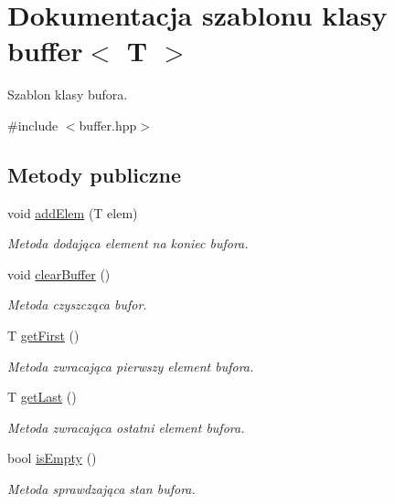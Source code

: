 \hypertarget{classbuffer}{}\section{Dokumentacja szablonu klasy buffer$<$ T $>$}
\label{classbuffer}


Szablon klasy bufora.  




{\ttfamily \#include $<$buffer.\+hpp$>$}

\subsection*{Metody publiczne}
\begin{DoxyCompactItemize}
\item 
void \hyperlink{classbuffer_ac93ddd3a9a4bfbb30dc4df278cb51f8a}{add\+Elem} (T elem)
\begin{DoxyCompactList}\small\item\em Metoda dodająca element na koniec bufora. \end{DoxyCompactList}\item 
void \hyperlink{classbuffer_ab0d55e3e80f82ff361c9a6f14599fe19}{clear\+Buffer} ()
\begin{DoxyCompactList}\small\item\em Metoda czyszcząca bufor. \end{DoxyCompactList}\item 
T \hyperlink{classbuffer_a12c4847a2d852f62f6e17cda43d3720d}{get\+First} ()
\begin{DoxyCompactList}\small\item\em Metoda zwracająca pierwszy element bufora. \end{DoxyCompactList}\item 
T \hyperlink{classbuffer_a61bf98727f79c794f4e77b36499a87f9}{get\+Last} ()
\begin{DoxyCompactList}\small\item\em Metoda zwracająca ostatni element bufora. \end{DoxyCompactList}\item 
bool \hyperlink{classbuffer_a6529128cce7c8b3f85cdae95f22b0589}{is\+Empty} ()
\begin{DoxyCompactList}\small\item\em Metoda sprawdzająca stan bufora. \end{DoxyCompactList}\end{DoxyCompactItemize}


